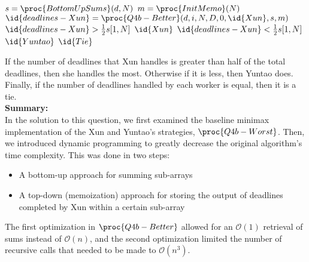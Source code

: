     \begin{spacing}{1.2}
        \begin{codebox}
            \li $s = \proc{BottomUpSums}(d, N)$
            \li $m = \proc{InitMemo}(N)$
            \li $\id{deadlines-Xun} = \proc{Q4b-Better}(d, i, N, D, 0, \id{Xun}, s, m)$
            \li \If $\id{deadlines-Xun} > {1 \over 2}s[1, N]$
                \Then
                    \li \Return $\id{Xun}$
                \li \ElseIf $\id{deadlines-Xun} < {1 \over 2}s[1, N]$
                \Then
                    \li \Return $\id{Yuntao}$
                \li \Else
                    \li \Return $\id{Tie}$
                \End
        \end{codebox}
    \end{spacing}
    \vspace{5mm}
    If the number of deadlines that Xun handles is greater than half of the total deadlines, then she handles the most.
    Otherwise if it is less, then Yuntao does.
    Finally, if the number of deadlines handled by each worker is equal, then it is a tie.\\

    \textbf{Summary:}\\
    In the solution to this question, we first examined the baseline minimax implementation of the Xun and Yuntao's strategies, $\proc{Q4b-Worst}$.
    Then, we introduced dynamic programming to greatly decrease the original algorithm's time complexity.
    This was done in two steps:
    \begin{spacing}{1}
    \begin{itemize}
        \item A bottom-up approach for summing sub-arrays
        \item A top-down (memoization) approach for storing the output of deadlines completed by Xun within a certain sub-array
    \end{itemize}
    \end{spacing}

    The first optimization in $\proc{Q4b-Better}$ allowed for an $\mathcal{O}(1)$ retrieval of sums instead of $\mathcal{O}(n)$, and the second optimization limited the number of recursive calls that needed to be made to $\mathcal{O}(n^3)$.